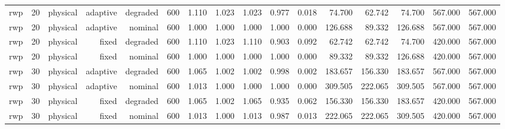 \begin{tabular}{lrrrrrrrrrrrrrrr}
rwp & 20 & physical & adaptive & degraded & 600 & 1.110 & 1.023 & 1.023 & 0.977 & 0.018 & 74.700 & 62.742 & 74.700 & 567.000 & 567.000 \\
rwp & 20 & physical & adaptive & nominal & 600 & 1.000 & 1.000 & 1.000 & 1.000 & 0.000 & 126.688 & 89.332 & 126.688 & 567.000 & 567.000 \\
rwp & 20 & physical & fixed & degraded & 600 & 1.110 & 1.023 & 1.110 & 0.903 & 0.092 & 62.742 & 62.742 & 74.700 & 420.000 & 567.000 \\
rwp & 20 & physical & fixed & nominal & 600 & 1.000 & 1.000 & 1.000 & 1.000 & 0.000 & 89.332 & 89.332 & 126.688 & 420.000 & 567.000 \\
rwp & 30 & physical & adaptive & degraded & 600 & 1.065 & 1.002 & 1.002 & 0.998 & 0.002 & 183.657 & 156.330 & 183.657 & 567.000 & 567.000 \\
rwp & 30 & physical & adaptive & nominal & 600 & 1.013 & 1.000 & 1.000 & 1.000 & 0.000 & 309.505 & 222.065 & 309.505 & 567.000 & 567.000 \\
rwp & 30 & physical & fixed & degraded & 600 & 1.065 & 1.002 & 1.065 & 0.935 & 0.062 & 156.330 & 156.330 & 183.657 & 420.000 & 567.000 \\
rwp & 30 & physical & fixed & nominal & 600 & 1.013 & 1.000 & 1.013 & 0.987 & 0.013 & 222.065 & 222.065 & 309.505 & 420.000 & 567.000 \\
\bottomrule
\end{tabular}